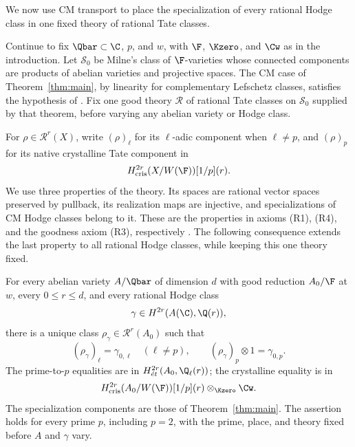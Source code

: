 We now use CM transport to place the specialization of every rational
Hodge class in one fixed theory of rational Tate classes.

Continue to fix \(\Qbar\subset\C\), \(p\), and \(w\), with
\(\F\), \(\Kzero\), and \(\Cw\) as in the introduction. Let
\(\mathcal S_0\) be Milne's class of \(\F\)-varieties whose connected
components are products of abelian varieties and projective spaces.
The CM case of Theorem~\ref{thm:main}, by linearity for complementary
Lefschetz classes, satisfies the hypothesis of
\cite[Theorem~4.5]{Milne2009}. Fix one good theory \(\mathcal R\) of
rational Tate classes on \(\mathcal S_0\) supplied by that theorem,
before varying any abelian variety or Hodge class.

For \(\rho\in\mathcal R^r(X)\), write \((\rho)_\ell\) for its
\(\ell\)-adic component when \(\ell\ne p\), and \((\rho)_p\) for
its native crystalline Tate component in
\[
 H^{2r}_{\mathrm{cris}}(X/W(\F))[1/p](r).
\]
We use three properties of the theory.  Its spaces are rational vector
spaces preserved by pullback, its realization maps are injective, and
specializations of CM Hodge classes belong to it.  These are the
properties in axioms \textup{(R1)}, \textup{(R4)}, and the goodness
axiom \textup{(R3)}, respectively
\cite[Definitions~2.1 and~3.1]{Milne2009}.  The following consequence
extends the last property to all rational Hodge classes, while keeping
this one theory fixed.

\begin{corollary}
\label{cor:all-hodge-specialization}
For every abelian variety \(A/\Qbar\) of dimension \(d\) with good
reduction \(A_0/\F\) at \(w\), every \(0\leq r\leq d\), and every
rational Hodge class
\[
 \gamma\in H^{2r}(A(\C),\Q(r)),
\]
there is a unique class \(\rho_\gamma\in\mathcal R^r(A_0)\) such that
\[
 (\rho_\gamma)_\ell=\gamma_{0,\ell}\quad(\ell\ne p),\qquad
 (\rho_\gamma)_p\otimes 1=\gamma_{0,p}.
\]
The prime-to-\(p\) equalities are in
\(H^{2r}_{\acute{e}t}(A_0,\Q_\ell(r))\); the crystalline equality is in
\[
 H^{2r}_{\mathrm{cris}}(A_0/W(\F))[1/p](r)
       \otimes_{\Kzero}\Cw.
\]
The specialization components are those of Theorem~\ref{thm:main}.
The assertion holds for every prime \(p\),
including \(p=2\), with the prime, place, and theory fixed before
\(A\) and \(\gamma\) vary.
\end{corollary}

